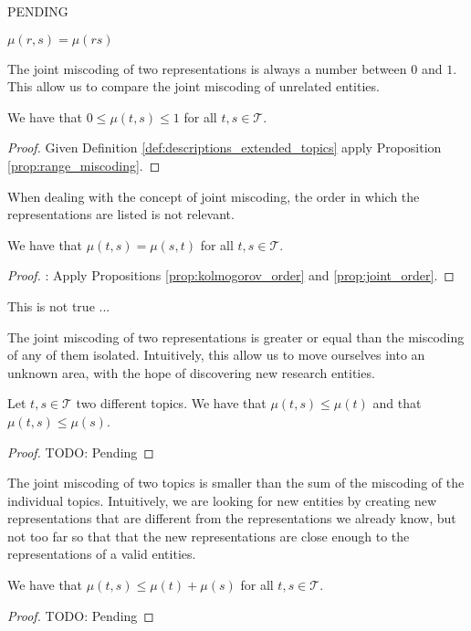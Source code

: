 \begin{example}
{\color{red} PENDING}
\end{example}

$\mu(r, s) = \mu(rs)$

The joint miscoding of two representations is always a number between $0$ and $1$. This allow us to compare the joint miscoding of unrelated entities.

\begin{proposition}
We have that $0 \leq \mu(t,s) \leq 1$ for all $t, s \in \mathcal{T}$.
\end{proposition}
\begin{proof}
Given Definition \ref{def:descriptions_extended_topics} apply Proposition \ref{prop:range_miscoding}.
\end{proof}

When dealing with the concept of joint miscoding, the order in which the representations are listed is not relevant.

\begin{proposition}
We have that $\mu(t,s) = \mu(s,t)$ for all $t,s \in \mathcal{T}$.
\end{proposition}
\begin{proof}
{\color{red}: Apply Propositions \ref{prop:kolmogorov_order} and \ref{prop:joint_order}.}
\end{proof}

This is not true ...

The joint miscoding of two representations is greater or equal than the miscoding of any of them isolated. Intuitively, this allow us to move ourselves into an unknown area, with the hope of discovering new research entities.

\begin{proposition}
Let $t, s \in \mathcal{T}$ two different topics. We have that $\mu(t,s) \leq \mu(t)$ and that $\mu(t,s) \leq \mu(s)$.
\end{proposition}
\begin{proof}
{\color{red} TODO: Pending}
\end{proof}

The joint miscoding of two topics is smaller than the sum of the miscoding of the individual topics. Intuitively, we are looking for new entities by creating new representations that are different from the representations we already know, but not too far so that that the new representations are close enough to the representations of a valid entities.

\begin{proposition}
We have that $\mu(t,s) \leq \mu(t) + \mu(s)$ for all $t, s \in \mathcal{T}$.
\end{proposition}
\begin{proof}
{\color{red} TODO: Pending}
\end{proof}

